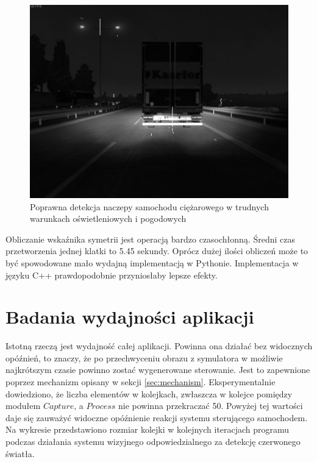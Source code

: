 \begin{figure}
  \centering
  \includegraphics[width=13cm]{img/alg3_res3.jpg}
  \caption{Poprawna detekcja naczepy samochodu ciężarowego w trudnych warunkach oświetleniowych i pogodowych}
  \label{fig:alg3_rain_late}
\end{figure}

Obliczanie wskaźnika symetrii jest operacją bardzo czasochłonną. Średni czas przetworzenia jednej klatki to 5.45 sekundy. Oprócz dużej ilości obliczeń może to być spowodowane mało wydajną implementacją w Pythonie. Implementacja w języku C++ prawdopodobnie przyniosłaby lepsze efekty.

\section{Badania wydajności aplikacji}
Istotną rzeczą jest wydajność całej aplikacji. Powinna ona działać bez widocznych opóźnień, to znaczy, że po przechwyceniu obrazu z symulatora w możliwie najkrótszym czasie powinno zostać wygenerowane sterowanie. Jest to zapewnione poprzez mechanizm opisany w sekcji \ref{sec:mechanism}. Eksperymentalnie dowiedziono, że liczba elementów w kolejkach, zwłaszcza w kolejce pomiędzy modułem $Capture$, a $Process$ nie powinna przekraczać 50. Powyżej tej wartości daje się zauważyć widoczne opóźnienie reakcji systemu sterującego samochodem. Na wykresie przedstawiono rozmiar kolejki w kolejnych iteracjach programu podczas działania systemu wizyjnego odpowiedzialnego za detekcję czerwonego światła.

